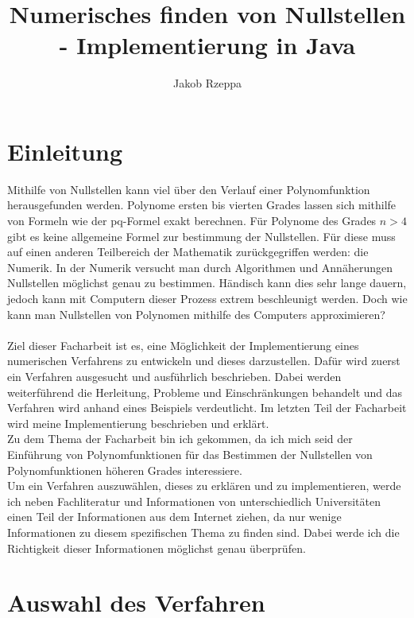 \documentclass[12pt]{article}
\title{Numerisches finden von Nullstellen - Implementierung in Java}
\author{Jakob Rzeppa}
\begin{document}
\tableofcontents

\section{Einleitung}
Mithilfe von Nullstellen kann viel über den Verlauf einer Polynomfunktion herausgefunden werden. Polynome ersten bis vierten Grades lassen sich mithilfe von Formeln wie der pq-Formel exakt berechnen. Für Polynome des Grades $n > 4$ gibt es keine allgemeine Formel zur bestimmung der Nullstellen. Für diese muss auf einen anderen Teilbereich der Mathematik zurückgegriffen werden: die Numerik. In der Numerik versucht man durch Algorithmen und Annäherungen Nullstellen möglichst genau zu bestimmen. Händisch kann dies sehr lange dauern, jedoch kann mit Computern dieser Prozess extrem beschleunigt werden. Doch wie kann man Nullstellen von Polynomen mithilfe des Computers approximieren?\\
\\
Ziel dieser Facharbeit ist es, eine Möglichkeit der Implementierung eines numerischen Verfahrens zu entwickeln und dieses darzustellen. Dafür wird zuerst ein Verfahren ausgesucht und ausführlich beschrieben. Dabei werden weiterführend die Herleitung, Probleme und Einschränkungen behandelt und das Verfahren wird anhand eines Beispiels verdeutlicht. Im letzten Teil der Facharbeit wird meine Implementierung beschrieben und erklärt.\\
Zu dem Thema der Facharbeit bin ich gekommen, da ich mich seid der Einführung von Polynomfunktionen für das Bestimmen der Nullstellen von Polynomfunktionen höheren Grades interessiere. %
\\
Um ein Verfahren auszuwählen, dieses zu erklären und zu implementieren, werde ich neben Fachliteratur und Informationen von unterschiedlich Universitäten einen Teil der Informationen aus dem Internet ziehen, da nur wenige Informationen zu diesem spezifischen Thema zu finden sind. Dabei werde ich die Richtigkeit dieser Informationen möglichst genau überprüfen. %

\section{Auswahl des Verfahren}
\end{document}
